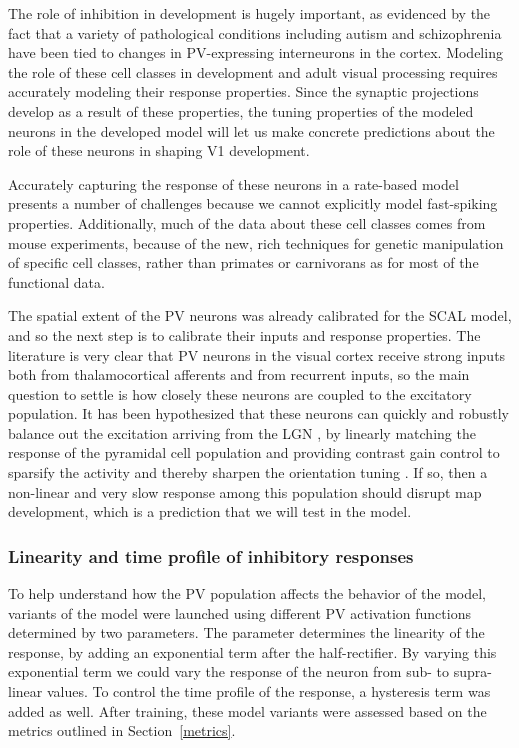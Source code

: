 The role of inhibition in development is hugely important, as
evidenced by the fact that a variety of pathological conditions
including autism \citep{Wohr2015} and schizophrenia \citep{Lewis2012}
have been tied to changes in PV-expressing interneurons in the
cortex. Modeling the role of these cell classes in development and
adult visual processing requires accurately modeling their response
properties. Since the synaptic projections develop as a result of
these properties, the tuning properties of the modeled neurons in the
developed model will let us make concrete predictions about the role
of these neurons in shaping V1 development.

Accurately capturing the response of these neurons in a rate-based
model presents a number of challenges because we cannot explicitly
model fast-spiking properties. Additionally, much of the data about
these cell classes comes from mouse experiments, because of the new,
rich techniques for genetic manipulation of specific cell classes,
rather than primates or carnivorans as for most of the functional
data.

The spatial extent of the PV neurons was already calibrated for the
SCAL model, and so the next step is to calibrate their inputs and
response properties. The literature is very clear that PV neurons in
the visual cortex receive strong inputs both from thalamocortical
afferents and from recurrent inputs, so the main question to settle is
how closely these neurons are coupled to the excitatory population. It
has been hypothesized that these neurons can quickly and robustly
balance out the excitation arriving from the LGN \citep{Swadlow2003,
  Burkhalter2008}, by linearly matching the response of the pyramidal
cell population and providing contrast gain control to sparsify the
activity and thereby sharpen the orientation tuning
\citep{Wilson2012}.  If so, then a non-linear and very slow response
among this population should disrupt map development, which is a
prediction that we will test in the model.

\subsubsection{Linearity and time profile of inhibitory responses}

To help understand how the PV population affects the behavior of the
model, variants of the model were launched using different PV
activation functions determined by two parameters. The parameter
determines the linearity of the response, by adding an exponential
term after the half-rectifier. By varying this exponential term we
could vary the response of the neuron from sub- to supra-linear
values. To control the time profile of the response, a hysteresis term
was added as well. After training, these model variants were assessed
based on the metrics outlined in Section~\ref{metrics}.

